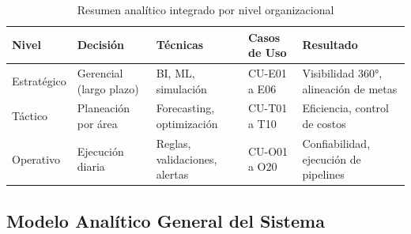 ﻿\documentclass[11pt, letterpaper]{article}
\begin{document}
\begin{table}[H]

\small

\centering

\begin{tabularx}{\linewidth}{>{\raggedright\arraybackslash}p{1.8cm} >{\raggedright\arraybackslash}p{2.5cm} >{\raggedright\arraybackslash}p{3cm} >{\raggedright\arraybackslash}p{2cm} >{\raggedright\arraybackslash}X}

\toprule

\textbf{Nivel} & \textbf{Decisión} & \textbf{Técnicas} & \textbf{Casos de Uso} & \textbf{Resultado} \\

\midrule

Estratégico & Gerencial (largo plazo) & BI, ML, simulación & CU-E01 a E06 & Visibilidad 360°, alineación de metas \\

\midrule

Táctico & Planeación por área & Forecasting, optimización & CU-T01 a T10 & Eficiencia, control de costos \\

\midrule

Operativo & Ejecución diaria & Reglas, validaciones, alertas & CU-O01 a O20 & Confiabilidad, ejecución de pipelines \\

\bottomrule

\end{tabularx}

\caption{Resumen analítico integrado por nivel organizacional}

\end{table}




\subsection{Modelo Analítico General del Sistema}
\end{document}
